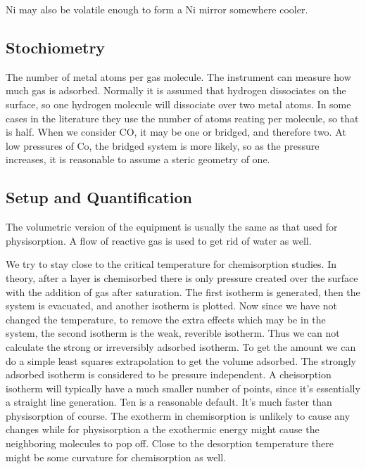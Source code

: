 \documentclass[12pt,a4paper,oneside,headinclude]{scrartcl}
\numberwithin{figure}{section}
\numberwithin{equation}{section}
\numberwithin{table}{section}
\begin{document}
Ni may also be volatile enough to form a Ni mirror somewhere cooler.

\subsection{Stochiometry}
\label{sec:org7a84db3}
The number of metal atoms per gas molecule. The instrument can measure how much
gas is adsorbed. Normally it is assumed that hydrogen dissociates on the
surface, so one hydrogen molecule will dissociate over two metal atoms. In some
cases in the literature they use the number of atoms reating per molecule, so
that is half. When we consider CO, it may be one or bridged, and therefore two.
At low pressures of Co, the bridged system is more likely, so as the pressure
increases, it is reasonable to assume a steric geometry of one.
\subsection{Setup and Quantification}
\label{sec:org3afa21a}
The volumetric version of the equipment is usually the same as that used for
physisorption. A flow of reactive gas is used to get rid of water as well.

We try to stay close to the critical temperature for chemisorption studies.
In theory, after a layer is chemisorbed there is only pressure created over the
surface with the addition of gas after saturation. The first isotherm is
generated, then the system is evacuated, and another isotherm is plotted. Now
since we have not changed the temperature, to remove the extra effects which may
be in the system, the second isotherm is the weak, reverible isotherm. Thus we
can not calculate the strong or irreversibly adsorbed isotherm. To get the
amount we can do a simple least squares extrapolation to get the volume
adsorbed. The strongly adsorbed isotherm is considered to be pressure
independent. A cheisorption isotherm will typically have a much smaller number
of points, since it's essentially a straight line generation. Ten is a
reasonable default. It's much faster than physisorption of course. The exotherm
in chemisorption is unlikely to cause any changes while for physisorption a the
exothermic energy might cause the neighboring molecules to pop off. Close to the
desorption temperature there might be some curvature for chemisorption as well.
\end{document}
